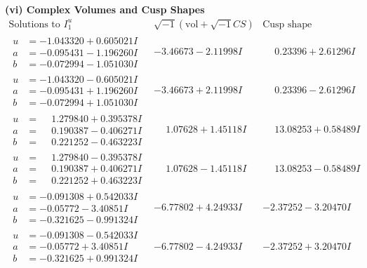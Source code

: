 \documentclass[1p]{elsarticle_modified}
\theoremstyle{definition}
\newcommand{\I}{\sqrt{-1}}
\begin{document}
\newpage\flushleft \textbf{(vi) Complex Volumes and Cusp Shapes}
$$\begin{array}{c|c|c}  
\text{Solutions to }I^u_{1}& \I (\text{vol} + \sqrt{-1}CS) & \text{Cusp shape}\\
 \hline 
\begin{aligned}
u &= -1.043320 + 0.605021 I \\
a &= -0.095431 - 1.196260 I \\
b &= -0.072994 - 1.051030 I\end{aligned}
 & -3.46673 - 2.11998 I & \phantom{-}0.23396 + 2.61296 I \\ \hline\begin{aligned}
u &= -1.043320 - 0.605021 I \\
a &= -0.095431 + 1.196260 I \\
b &= -0.072994 + 1.051030 I\end{aligned}
 & -3.46673 + 2.11998 I & \phantom{-}0.23396 - 2.61296 I \\ \hline\begin{aligned}
u &= \phantom{-}1.279840 + 0.395378 I \\
a &= \phantom{-}0.190387 - 0.406271 I \\
b &= \phantom{-}0.221252 - 0.463223 I\end{aligned}
 & \phantom{-}1.07628 + 1.45118 I & \phantom{-}13.08253 + 0.58489 I \\ \hline\begin{aligned}
u &= \phantom{-}1.279840 - 0.395378 I \\
a &= \phantom{-}0.190387 + 0.406271 I \\
b &= \phantom{-}0.221252 + 0.463223 I\end{aligned}
 & \phantom{-}1.07628 - 1.45118 I & \phantom{-}13.08253 - 0.58489 I \\ \hline\begin{aligned}
u &= -0.091308 + 0.542033 I \\
a &= -0.05772 - 3.40851 I \\
b &= -0.321625 - 0.991324 I\end{aligned}
 & -6.77802 + 4.24933 I & -2.37252 - 3.20470 I \\ \hline\begin{aligned}
u &= -0.091308 - 0.542033 I \\
a &= -0.05772 + 3.40851 I \\
b &= -0.321625 + 0.991324 I\end{aligned}
 & -6.77802 - 4.24933 I & -2.37252 + 3.20470 I \\ \hline\begin{aligned}

\end{aligned}
\end{array}$$
\end{document}
